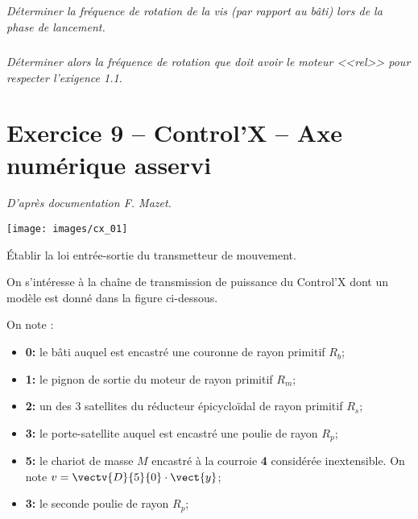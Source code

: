 \documentclass[10pt,fleqn]{article} %
\begin{document}
\begin{multicols}{2}
\begin{multicols}{2}
\fi


\subparagraph{}
\textit{Déterminer la fréquence de rotation de la vis (par rapport au bâti) lors de la phase de lancement.}
\ifprof
\begin{corrige}
\end{corrige}
\else
\fi

\subparagraph{}
\textit{Déterminer alors la fréquence de rotation que doit avoir le moteur <<rel>> pour respecter l'exigence 1.1.}
\ifprof
\begin{corrige}
\end{corrige}
\else
\fi



\section*{Exercice 9 -- Control'X -- Axe numérique asservi}
\setcounter{exo}{0}

\textit{ D'après documentation F. Mazet.} \\

\ifprof
\else
\begin{center}
\texttt{[image: images/cx\_01]}
\end{center}

\begin{obj} Établir la loi entrée-sortie du transmetteur de mouvement. 
\end{obj}


On s'intéresse à la chaîne de transmission de puissance du Control'X dont un modèle est donné dans la figure ci-dessous.

On note : 
\begin{itemize}
\item \textbf{0:} le bâti auquel est encastré une couronne de rayon primitif $R_b$;
\item \textbf{1:} le pignon de sortie du moteur de rayon primitif $R_m$;
\item \textbf{2:} un des 3 satellites du réducteur épicycloïdal de rayon primitif $R_s$;
\item \textbf{3:} le porte-satellite auquel est encastré une poulie de rayon $R_p$;
\item \textbf{5:} le chariot de masse $M$ encastré à la courroie \textbf{4} considérée inextensible. On note $v=\vectv{D}{5}{0}\cdot \vect{y}$;
\item \textbf{3:} le seconde poulie de rayon $R_p$;
\end{itemize}



\end{multicols}
\end{multicols}
\end{document}
